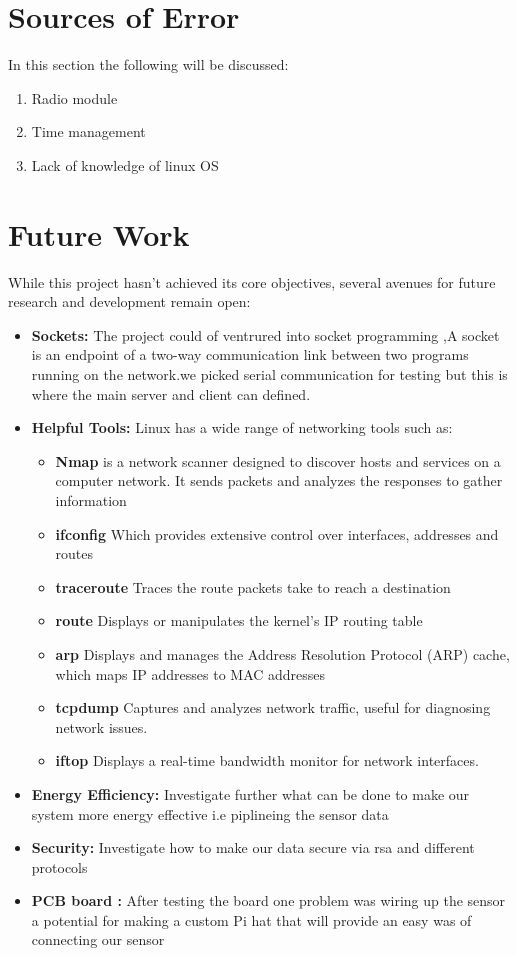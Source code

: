 \section{Sources of Error}
In this section the following will be discussed:
\begin{enumerate}
    \item Radio module
    \item Time management
    \item Lack of knowledge of linux OS
\end{enumerate}
\section{Future Work}

While this project hasn't achieved its core objectives, several avenues for future research and development remain open:

\begin{itemize}
    \item \textbf{Sockets:} The project could of ventrured into socket programming ,A socket is an endpoint of a two-way communication link between two programs running on the network.we picked serial communication for testing  but this is where the main server and client can defined.
    \item \textbf{Helpful Tools:}  Linux has a wide range of networking tools such as:
    \begin{itemize}
        \item\textbf{Nmap} is a network scanner designed to discover hosts and services on a computer network. It sends packets and analyzes the responses to gather information 
        \item \textbf{ifconfig} Which provides extensive control over interfaces, addresses and routes
        \item \textbf{traceroute} Traces the route packets take to reach a destination
        \item \textbf{route} Displays or manipulates the kernel's IP routing table
        \item \textbf{arp} Displays and manages the Address Resolution Protocol (ARP) cache, which maps IP addresses to MAC addresses
        \item \textbf{tcpdump} Captures and analyzes network traffic, useful for diagnosing network issues.
        \item \textbf{iftop} Displays a real-time bandwidth monitor for network interfaces.
    \end{itemize} 
    \item \textbf{Energy Efficiency:} Investigate further what can be done to make  our system more energy effective i.e piplineing the sensor data
    \item \textbf{Security:} Investigate how to make our data secure via rsa and different protocols
    \item \textbf{PCB board :} After testing the board one problem was wiring up the sensor a potential for making a custom  Pi hat that will provide an easy was of connecting  our sensor 
 
   
\end{itemize}

